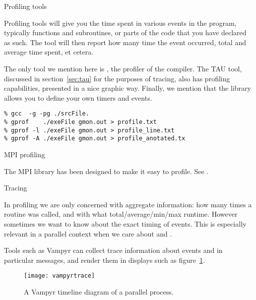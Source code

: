  {Profiling tools}

Profiling tools will give you the time spent in various events in the
program, typically functions and subroutines, or parts of the code
that you have declared as such. The tool will then report how many
time the event occurred, total and average time spent, et cetera.

The only tool we mention here is , the profiler of
the  compiler. The TAU tool, discussed in section~\ref{sec:tau}
for the purposes of tracing,
also has profiling capabilities, presented in a nice graphic way.
Finally, we mention that the  library
allows you to define your own timers and events.

\begin{verbatim}
% gcc  -g -pg ./srcFile.
% gprof    ./exeFile gmon.out > profile.txt
% gprof -l ./exeFile gmon.out > profile_line.txt
% gprof -A ./exeFile gmon.out > profile_anotated.tx
\end{verbatim}

 {MPI profiling}

The MPI library has been designed to make it easy to profile.
See .

 {Tracing}

In profiling we are only concerned with aggregate information: how
many times a routine was called, and with what total/average/min/max
runtime. However sometimes we want to know about the exact timing of
events. This is especially relevant in a parallel context when we care
about  and .

Tools such as Vampyr can collect trace information about
events and in particular messages, and render them in displays such as
figure~\ref{fig:vampyr}.
\begin{figure}[ht]
  \texttt{[image: vampyrtrace]}
  \caption{A Vampyr timeline diagram of a parallel process.}
  \label{fig:vampyr}
\end{figure}

